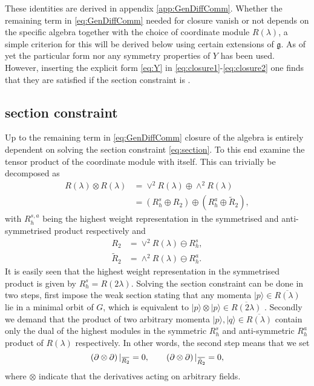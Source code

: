 These identities are derived in appendix \ref{app:GenDiffComm}. Whether the remaining term in \eqref{eq:GenDiffComm} needed for closure vanish or not depends on the specific algebra together with the choice of coordinate module $R(\lambda)$, a simple criterion for this will be derived below using certain extensions of $\mathfrak{g}$. As of yet the particular form nor any symmetry properties of $Y$ has been used. However, inserting the explicit form \eqref{eq:Y} in \eqref{eq:closure1}-\eqref{eq:closure2} one finds that they are satisfied if the section constraint is \cite{Palmkvist2015ExpGeomSuperAlg}.

\subsection{section constraint}
Up to the remaining term in \eqref{eq:GenDiffComm} closure of the algebra is entirely dependent on solving the section constraint \eqref{eq:section}. To this end examine the tensor product of the coordinate module with itself. This can trivially be decomposed as
\begin{equation}\label{eq:SectionConditionReps}
    \begin{aligned}
        R(\lambda)\otimes R(\lambda) &= \vee^2 R(\lambda)\oplus \wedge^2R(\lambda)\\
        &= \left(R_h^s\oplus R_2\right)\oplus\left(R_h^a\oplus \tilde{R}_2\right),
    \end{aligned}
\end{equation}
with $R_h^{s,a}$ being the highest weight representation in the symmetrised and anti-symmetrised product respectively and
\begin{align}
    R_2 &= \vee^2 R(\lambda)\ominus R_h^s,\\
    \tilde{R}_2 &= \wedge^2R(\lambda)\ominus  R_h^a.
\end{align}
It is easily seen that the highest weight representation in the symmetrised product is given by $R_h^s=R(2\lambda)$. Solving the section constraint can be done in two steps, first impose the weak section stating that any momenta $|p\rangle\in \overbar{R(\lambda)}$ lie in a minimal orbit of $G$, which is equivalent to $|p\rangle\otimes|p\rangle \in \overbar{R(2\lambda)}$ \cite{Berman2013,Bossard2017}. Secondly we demand that the product of two arbitrary momenta $|p\rangle,|q\rangle\in\overbar{R(\lambda)}$ contain only the dual of the highest modules in the symmetric $R^s_h$ and anti-symmetric $R^a_h$ product of $R(\lambda)$ respectively. In other words, the second step means that we set 
\begin{equation}
    \left(\pd\otimes\pd\right)|_{\overbar{R_2}} = 0, \qquad \left(\pd\otimes\pd\right)|_{\overbar{\tilde{R}_2}} =0,
\end{equation}
where $\otimes$ indicate that the derivatives acting on arbitrary fields. 

